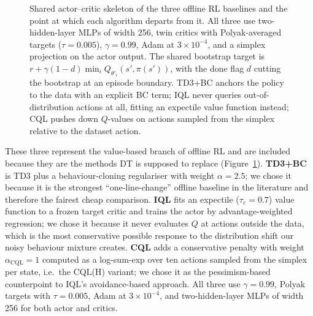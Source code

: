 \documentclass[11pt]{article}
\begin{document}
\begin{figure}[t]
\caption{Shared actor--critic skeleton of the three offline RL baselines and the point at which
each algorithm departs from it. All three use two-hidden-layer MLPs of width 256, twin critics
with Polyak-averaged targets ($\tau=0.005$), $\gamma = 0.99$, Adam at $3\times10^{-4}$, and a
simplex projection on the actor output. The shared bootstrap target is
$r + \gamma(1-d)\min_i Q_{\theta'_i}(s', \pi(s'))$, with the done flag $d$ cutting the bootstrap
at an episode boundary. TD3+BC \cite{fujimoto2021minimalist} anchors the
policy to the data with an explicit BC term; IQL \cite{kostrikov2022offline} never queries
out-of-distribution actions at all, fitting an expectile value function instead; CQL
\cite{kumar2020conservative} pushes down $Q$-values on actions sampled from the simplex
relative to the dataset action.}
\label{fig:offlinerl}
\end{figure}

These three represent the value-based branch of offline RL and are included because they are
the methods DT is supposed to replace (Figure~\ref{fig:offlinerl}). \textbf{TD3+BC}
\cite{fujimoto2021minimalist} is TD3 \cite{fujimoto2018addressing} plus a behaviour-cloning
regulariser with weight $\alpha=2.5$; we chose it because it is the strongest
``one-line-change'' offline baseline in the literature and therefore the fairest cheap
comparison. \textbf{IQL} \cite{kostrikov2022offline} fits an expectile ($\tau_e = 0.7$) value
function to a frozen target critic and trains the actor by advantage-weighted regression; we
chose it because it never evaluates $Q$ at actions outside the data, which is the most
conservative possible response to the distribution shift our noisy behaviour mixture creates.
\textbf{CQL} \cite{kumar2020conservative} adds a conservative penalty with weight
$\alpha_{\text{CQL}}=1$ computed as a log-sum-exp over ten actions sampled from the simplex per
state, i.e.\ the CQL(H) variant; we chose it as the pessimism-based counterpoint to IQL's
avoidance-based approach. All three use $\gamma = 0.99$, Polyak targets with $\tau = 0.005$,
Adam at $3\times 10^{-4}$, and two-hidden-layer MLPs of width 256 for both actor and critics.
\end{document}
